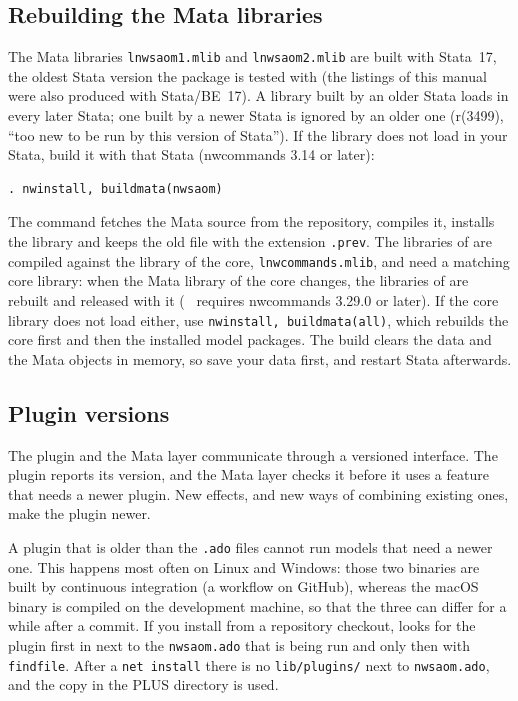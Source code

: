 \subsection{Rebuilding the Mata libraries}\label{sec:buildmata}

The Mata libraries \texttt{lnwsaom1.mlib} and \texttt{lnwsaom2.mlib} are built with Stata~17, the oldest Stata version the package is tested with (the listings of this manual were also produced with Stata/BE~17). A library built by an older Stata loads in every later Stata; one built by a newer Stata is ignored by an older one (r(3499), ``too new to be run by this version of Stata''). If the library does not load in your Stata, build it with that Stata (nwcommands 3.14 or later):
\begin{lstlisting}
. nwinstall, buildmata(nwsaom)
\end{lstlisting}
The command fetches the Mata source from the repository, compiles it, installs the library and keeps the old file with the extension \texttt{.prev}. The libraries of \nwsaom{} are compiled against the library of the core, \texttt{lnwcommands.mlib}, and need a matching core library: when the Mata library of the core changes, the libraries of \nwsaom{} are rebuilt and released with it (\nwsaom{}~\pkgversion{} requires nwcommands 3.29.0 or later). If the core library does not load either, use \texttt{nwinstall, buildmata(all)}, which rebuilds the core first and then the installed model packages. The build clears the data and the Mata objects in memory, so save your data first, and restart Stata afterwards.

\subsection{Plugin versions}

The plugin and the Mata layer communicate through a versioned interface. The plugin reports its version, and the Mata layer checks it before it uses a feature that needs a newer plugin. New effects, and new ways of combining existing ones, make the plugin newer.

A plugin that is older than the \texttt{.ado} files cannot run models that need a newer one. This happens most often on Linux and Windows: those two binaries are built by continuous integration (a workflow on GitHub), whereas the macOS binary is compiled on the development machine, so that the three can differ for a while after a commit. If you install from a repository checkout, \nwsaom{} looks for the plugin first in  next to the \texttt{nwsaom.ado} that is being run and only then with \texttt{findfile}. After a \texttt{net install} there is no \texttt{lib/plugins/} next to \texttt{nwsaom.ado}, and the copy in the PLUS directory is used.

